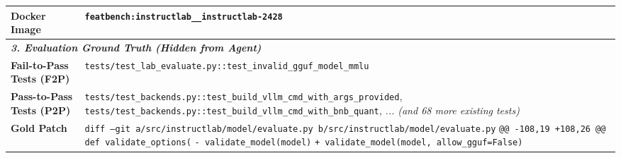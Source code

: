 \begin{table}[ht]
{\begin{tabular}{l|p{}}
        \textbf{Docker Image} & 
        \texttt{featbench:instructlab\_\_instructlab-2428} \\
        
        \midrule
        \multicolumn{2}{l}{\cellcolor{gray!10}\textit{\textbf{3. Evaluation Ground Truth (Hidden from Agent)}}} \\
        \textbf{Fail-to-Pass Tests (F2P)} & 
        \small \texttt{tests/test\_lab\_evaluate.py::test\_invalid\_gguf\_model\_mmlu} \\
        
        \textbf{Pass-to-Pass Tests (P2P)} & 
        \small \texttt{tests/test\_backends.py::test\_build\_vllm\_cmd\_with\_args\_provided}, \newline
        \small \texttt{tests/test\_backends.py::test\_build\_vllm\_cmd\_with\_bnb\_quant}, \newline
        \textit{... (and 68 more existing tests)} \\
        
        \textbf{Gold Patch} & 
        \small \texttt{diff --git a/src/instructlab/model/evaluate.py b/src/instructlab/model/evaluate.py} \newline
        \small \texttt{@@ -108,19 +108,26 @@ def validate\_options(} \newline
        \small \texttt{- \quad validate\_model(model)} \newline
        \small \texttt{+ \quad validate\_model(model, allow\_gguf=False)} \\
        \bottomrule
    \end{tabular}
    }
\end{table}